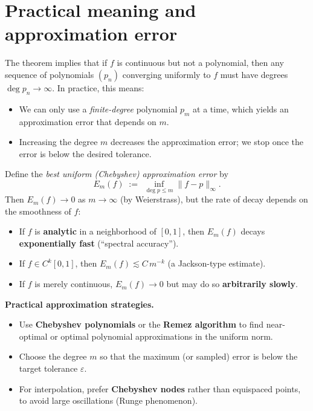 \documentclass[12pt,a4paper]{article}
\theoremstyle{plain}
\theoremstyle{definition}
\theoremstyle{remark}
\theoremstyle{remark}
\begin{document}
\section*{Practical meaning and approximation error}

The theorem implies that if $f$ is continuous but not a polynomial, then any sequence of
polynomials $(p_n)$ converging uniformly to $f$ must have degrees $\deg p_n\to\infty$.
In practice, this means:

\begin{itemize}\setlength{\itemsep}{0.7em}
	\item We can only use a \emph{finite-degree} polynomial $p_m$ at a time,
	which yields an approximation error that depends on $m$.
	\item Increasing the degree $m$ decreases the approximation error;
	we stop once the error is below the desired tolerance.
\end{itemize}

\bigskip

\noindent
Define the \emph{best uniform (Chebyshev) approximation error} by
\[
E_m(f) \;:=\; \inf_{\deg p\le m} \|f-p\|_\infty .
\]
Then $E_m(f)\to 0$ as $m\to\infty$ (by Weierstrass), but the rate of decay
depends on the smoothness of $f$:

\begin{itemize}\setlength{\itemsep}{0.6em}
	\item If $f$ is \textbf{analytic} in a neighborhood of $[0,1]$,
	then $E_m(f)$ decays \textbf{exponentially fast}
	(``spectral accuracy'').
	\item If $f\in C^k[0,1]$, then $E_m(f)\lesssim C\,m^{-k}$ (a Jackson-type estimate).
	\item If $f$ is merely continuous, $E_m(f)\to0$ but may do so \textbf{arbitrarily slowly}.
\end{itemize}

\bigskip

\noindent
\textbf{Practical approximation strategies.}
\begin{itemize}
	\item Use \textbf{Chebyshev polynomials} or the \textbf{Remez algorithm}
	to find near-optimal or optimal polynomial approximations
	in the uniform norm.
	\item Choose the degree $m$ so that the maximum (or sampled) error
	is below the target tolerance $\varepsilon$.
	\item For interpolation, prefer \textbf{Chebyshev nodes} rather than
	equispaced points, to avoid large oscillations (Runge phenomenon).
\end{itemize}
\end{document}

